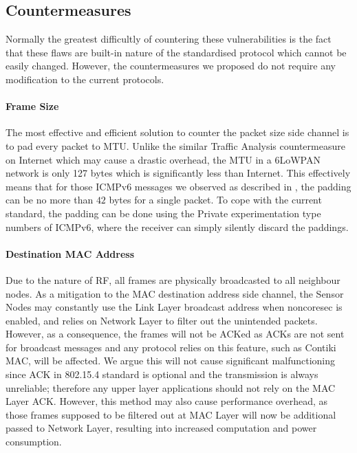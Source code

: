 \subsection{Countermeasures}

Normally the greatest difficultly of countering these vulnerabilities is the fact that these flaws are built-in nature of the standardised protocol which cannot be easily changed. However, the countermeasures we proposed do not require any modification to the current protocols.

\paragraph{Frame Size}

The most effective and efficient solution to counter the packet size side channel is to pad every packet to MTU. Unlike the similar Traffic Analysis countermeasure on Internet which may cause a drastic overhead, the MTU in a 6LoWPAN network is only 127 bytes which is significantly less than Internet. This effectively means that for those ICMPv6 messages we observed as described in 
, the padding can be no more than $42$ bytes for a single packet. To cope with the current standard, the padding can be done using the Private experimentation type numbers\cite{rfc4443} of ICMPv6, where the receiver can simply silently discard the paddings.

\paragraph{Destination MAC Address}

Due to the nature of RF, all frames are physically broadcasted to all neighbour nodes. As a mitigation to the MAC destination address side channel, the Sensor Nodes may constantly use the Link Layer broadcast address when noncoresec is enabled, and relies on Network Layer to filter out the unintended packets. However, as a consequence, the frames will not be ACKed as ACKs are not sent for broadcast messages and any protocol relies on this feature, such as Contiki MAC, will be affected. We argue this will not cause significant malfunctioning since ACK in 802.15.4 standard is optional and the transmission is always unreliable; therefore any upper layer applications should not rely on  the MAC Layer ACK. However, this method may also cause performance overhead, as those frames supposed to be filtered out at MAC Layer will now be additional passed to Network Layer, resulting into increased computation and power consumption.

